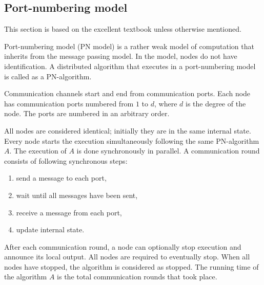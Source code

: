 




\subsection{Port-numbering model} \label{sec:port-numbering_model}
This section is based on the excellent textbook \cite{HirvonenSuomelaDistAlg2020} unless otherwise mentioned.

Port-numbering model (PN model) is a rather weak model of computation that inherits from the message passing model.
In the model, nodes do not have identification.
A distributed algorithm that executes in a port-numbering model is called as a PN-algorithm.


Communication channels start and end from communication ports.
Each node has communication ports numbered from $1$ to $d$, where $d$ is the degree of the node.
The ports are numbered in an arbitrary order.

All nodes are considered identical; initially they are in the same internal state.
Every node starts the execution simultaneously following the same PN-algorithm $A$.
The execution of $A$ is done synchronously in parallel.
A communication round consists of following synchronous steps:
\begin{enumerate}
  \item send a message to each port,
  \item wait until all messages have been sent,
  \item receive a message from each port,
  \item update internal state.
\end{enumerate}
After each communication round, a node can optionally stop execution and announce its local output.
All nodes are required to eventually stop.
When all nodes have stopped, the algorithm is considered as stopped.
The running time of the algorithm $A$ is the total communication rounds that took place.


